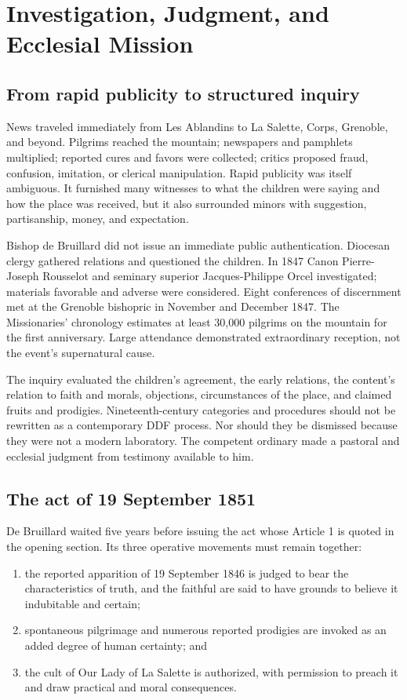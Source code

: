 \section{Investigation, Judgment, and Ecclesial Mission}

\subsection{From rapid publicity to structured inquiry}

News traveled immediately from Les Ablandins to La Salette, Corps, Grenoble, and beyond. Pilgrims reached the mountain; newspapers and pamphlets multiplied; reported cures and favors were collected; critics proposed fraud, confusion, imitation, or clerical manipulation. Rapid publicity was itself ambiguous. It furnished many witnesses to what the children were saying and how the place was received, but it also surrounded minors with suggestion, partisanship, money, and expectation.

Bishop de Bruillard did not issue an immediate public authentication. Diocesan clergy gathered relations and questioned the children. In 1847 Canon Pierre-Joseph Rousselot and seminary superior Jacques-Philippe Orcel investigated; materials favorable and adverse were considered. Eight conferences of discernment met at the Grenoble bishopric in November and December 1847. The Missionaries' chronology estimates at least 30,000 pilgrims on the mountain for the first anniversary. Large attendance demonstrated extraordinary reception, not the event's supernatural cause.

The inquiry evaluated the children's agreement, the early relations, the content's relation to faith and morals, objections, circumstances of the place, and claimed fruits and prodigies. Nineteenth-century categories and procedures should not be rewritten as a contemporary DDF process. Nor should they be dismissed because they were not a modern laboratory. The competent ordinary made a pastoral and ecclesial judgment from testimony available to him.

\subsection{The act of 19 September 1851}

De Bruillard waited five years before issuing the act whose Article 1 is quoted in the opening section. Its three operative movements must remain together:

\begin{enumerate}
  \item the reported apparition of 19 September 1846 is judged to bear the characteristics of truth, and the faithful are said to have grounds to believe it indubitable and certain;
  \item spontaneous pilgrimage and numerous reported prodigies are invoked as an added degree of human certainty; and
  \item the cult of Our Lady of La Salette is authorized, with permission to preach it and draw practical and moral consequences.
\end{enumerate}

